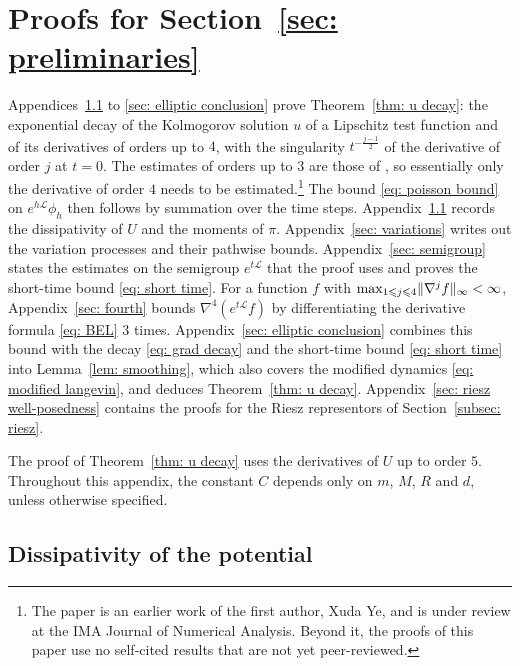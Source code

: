 \section{Proofs for Section~\ref{sec: preliminaries}}
\label{app: elliptic}

Appendices~\ref{sec: dissipative} to \ref{sec: elliptic conclusion} prove Theorem~\ref{thm: u decay}: the exponential decay of the Kolmogorov solution $u$ of a Lipschitz test function and of its derivatives of orders up to $4$, with the singularity $t^{-\frac{j-1}{2}}$ of the derivative of order $j$ at $t = 0$. The estimates of orders up to $3$ are those of \citep{ye2026mse}, so essentially only the derivative of order $4$ needs to be estimated.\footnote{The paper \citep{ye2026mse} is an earlier work of the first author, Xuda Ye, and is under review at the IMA Journal of Numerical Analysis. Beyond it, the proofs of this paper use no self-cited results that are not yet peer-reviewed.} The bound \eqref{eq: poisson bound} on $e^{h\mathcal L} \phi_h$ then follows by summation over the time steps. Appendix~\ref{sec: dissipative} records the dissipativity of $U$ and the moments of $\pi$. Appendix~\ref{sec: variations} writes out the variation processes and their pathwise bounds. Appendix~\ref{sec: semigroup} states the estimates on the semigroup $e^{t\mathcal L}$ that the proof uses and proves the short-time bound \eqref{eq: short time}. For a function $f$ with $\max_{1 \leqslant j \leqslant 4} \lVert \nabla^j f \rVert_\infty < \infty$, Appendix~\ref{sec: fourth} bounds $\nabla^4 (e^{t\mathcal L} f)$ by differentiating the derivative formula \eqref{eq: BEL} $3$ times. Appendix~\ref{sec: elliptic conclusion} combines this bound with the decay \eqref{eq: grad decay} and the short-time bound \eqref{eq: short time} into Lemma~\ref{lem: smoothing}, which also covers the modified dynamics \eqref{eq: modified langevin}, and deduces Theorem~\ref{thm: u decay}. Appendix~\ref{sec: riesz well-posedness} contains the proofs for the Riesz representors of Section~\ref{subsec: riesz}.

The proof of Theorem~\ref{thm: u decay} uses the derivatives of $U$ up to order $5$. Throughout this appendix, the constant $C$ depends only on $m$, $M$, $R$ and $d$, unless otherwise specified.

\subsection{Dissipativity of the potential}
\label{sec: dissipative}

